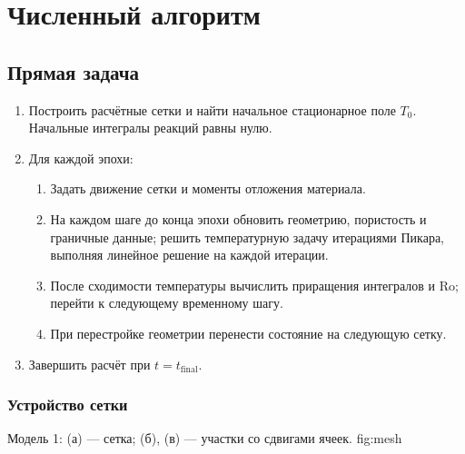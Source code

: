 \section{Численный алгоритм}
\label{sec:algorithm}

\subsection{Прямая задача}
\label{sec:forward-method}
{\color{red!75!black}
\begin{enumerate}
 \item Построить расчётные сетки и найти начальное стационарное поле $T_0$.
       Начальные интегралы реакций равны нулю.
 \item Для каждой эпохи:
   \begin{enumerate}
    \item Задать движение сетки и моменты отложения материала.
    \item На каждом шаге до конца эпохи обновить геометрию, пористость
          и граничные данные; решить температурную задачу итерациями Пикара,
          выполняя линейное решение на каждой итерации.
    \item После сходимости температуры вычислить приращения интегралов и Ro;
          перейти к следующему временному шагу.
    \item При перестройке геометрии перенести состояние на следующую сетку.
   \end{enumerate}
 \item Завершить расчёт при $t=t_{\mathrm{final}}$.
\end{enumerate}}

\subsubsection{Устройство сетки}
\label{sec:mesh}
  {Модель 1: (а) --- сетка; (б), (в) --- участки со сдвигами ячеек.}
  {fig:mesh}

